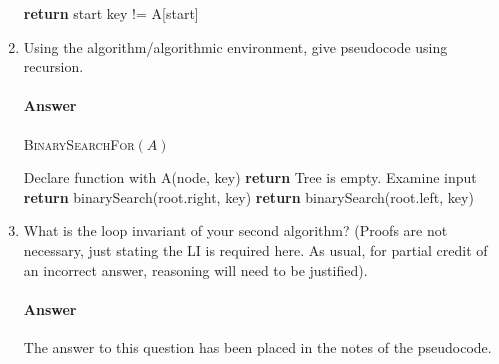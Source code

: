 \documentclass{article}
\begin{document}
\begin{enumerate}
\begin{algorithm}
\begin{algorithmic}
                    \State \textbf{return} start
                \EndIf
                \If key != A[start]
                \EndIf
            \end{algorithmic}
        \end{algorithm}


    \item Using the algorithm/algorithmic environment, give pseudocode using
        recursion.

        \paragraph{Answer}

        \begin{algorithm}
            \caption{\textsc{BinarySearchFor}$(A)$}\label{alg:recursion}
            \begin{algorithmic}
                \State Declare function with A(node, key)    
                    \State \textbf{return} Tree is empty. Examine input 
                \EndIf
                    \State \textbf{return} binarySearch(root.right, key)
                \EndIf
                    \State \textbf{return} binarySearch(root.left, key) 
                \EndIf
            \end{algorithmic}
        \end{algorithm}


    \item What is the loop invariant of your second algorithm? (Proofs are not
        necessary, just stating the LI is required here.  As usual, for partial
        credit of an incorrect answer, reasoning will need to be justified).

        \paragraph{Answer}

        The answer to this question has been placed in the notes of the pseudocode. 
\end{enumerate}

 
\end{document}
